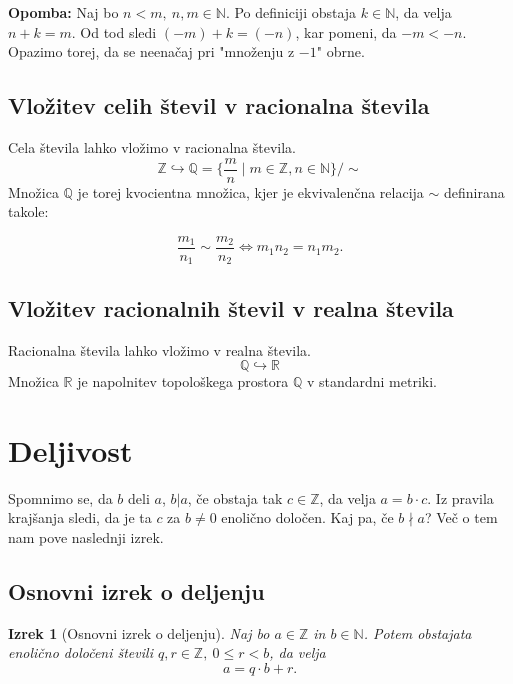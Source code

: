 \documentclass[12pt, a4paper]{article}
\newtheorem{izr}{Izrek}
\newenvironment{opom}[1][]{\par\medskip\noindent \textbf{Opomba: }}{\medskip}
\begin{document}
\begin{opom}
Naj bo $n<m,\ n,m \in\mathbb{N}$. Po definiciji obstaja $k\in \mathbb{N}$, da velja $n+k=m$. Od tod sledi $(-m) + k = (-n)$, kar pomeni, da $-m < -n$. Opazimo torej, da se neenačaj pri "množenju z $-1$" obrne.
\end{opom}

\subsection{Vložitev celih števil v racionalna števila}

Cela števila lahko vložimo v racionalna števila.
$$\mathbb{Z} \hookrightarrow \mathbb{Q}=\{ \frac{m}{n} \mid m \in \mathbb{Z}, n\in \mathbb{N}  \}/\sim$$
 Množica $\mathbb{Q}$ je torej kvocientna množica, kjer je ekvivalenčna relacija $\sim$ definirana takole:

$$ \frac{m_{1}}{n_{1}} \sim \frac{m_{2}}{n_{2}} \iff m_{1}n_{2}=n_{1}m_{2}.$$

\subsection{Vložitev racionalnih števil v realna števila}

Racionalna števila lahko vložimo v realna števila.
$$\mathbb{Q} \hookrightarrow \mathbb{R}$$
Množica $\mathbb{R}$ je napolnitev topološkega prostora $\mathbb{Q}$ v standardni metriki.


\section{Deljivost}

Spomnimo se, da $b$ deli $a$, $b|a$, če obstaja tak $c\in \mathbb{Z}$, da velja $a=b\cdot c$. Iz pravila krajšanja sledi, da je ta $c$ za $b\neq 0$ enolično določen. Kaj pa, če $b \nmid a$? Več o tem nam pove naslednji izrek.

\subsection{Osnovni izrek o deljenju}

\begin{izr}[Osnovni izrek o deljenju]
Naj bo $a\in \mathbb{Z}$ in $b\in \mathbb{N}$. Potem obstajata enolično določeni števili $q,r\in \mathbb{Z},\  0 \leq r < b$, da velja $$a=q\cdot b + r.$$
\end{izr}
\end{document}
